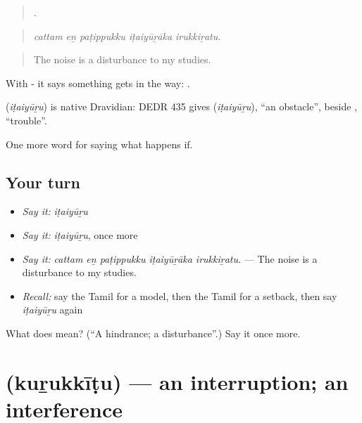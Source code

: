 \begin{quote}
    .
\end{quote}

\begin{quote}
\emph{cattam eṉ paṭippukku iṭaiyūṟāka irukkiṟatu.}
\end{quote}

\begin{quote}
The noise is a disturbance to my studies.
\end{quote}

With -  it says something gets in the way:  .

\begin{cousinweb}
\textbf{} (\emph{iṭaiyūṟu}) is native Dravidian: DEDR 435 gives  (\emph{iṭaiyūṟu}), \textquotedblleft{}an obstacle\textquotedblright{}, beside , \textquotedblleft{}trouble\textquotedblright{}.
\end{cousinweb}

\begin{grammarlens}[title={What you've built}]
One more word for saying what happens if.
\end{grammarlens}

\subsection*{Your turn}
\begin{itemize}
\raggedright
  \item \emph{Say it:} \emph{iṭaiyūṟu}
  \item \emph{Say it:} \emph{iṭaiyūṟu}, once more
  \item \emph{Say it:} \emph{cattam eṉ paṭippukku iṭaiyūṟāka irukkiṟatu.} — The noise is a disturbance to my studies.
  \item \emph{Recall:} say the Tamil for a model, then the Tamil for a setback, then say \emph{iṭaiyūṟu} again
\end{itemize}

\begin{tcolorbox}[breakable,colback=teal!4,colframe=teal!35!black,title={Before you move on}]
What does  mean? (\textquotedblleft{}A hindrance; a disturbance\textquotedblright{}.) Say it once more.
\end{tcolorbox}
\section[\texorpdfstring{\ta{குறுக்கீடு} (kuṟukkīṭu)}{குறுக்கீடு (kuṟukkīṭu)}]{ (kuṟukkīṭu) — an interruption; an interference}

